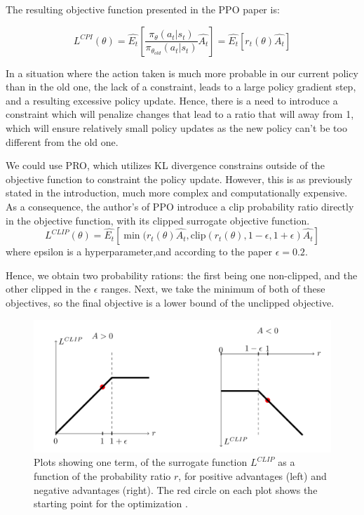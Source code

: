 \documentclass[12pt,a4paper]{article}
\begin{document}
The resulting objective function presented in the PPO paper is:

\begin{equation}
L^{CPI}(\theta) =\hat{E_{t}} [\frac{\pi_{\theta}(a_t|s_t)}{ \pi_{\theta_{old}} (a_t|s_t) }  \hat{{A_t}}  ]  = \hat{E_{t}}[r_t (\theta)  \hat{{A_t}} ]
\end{equation}

In a situation where the action taken is much more probable in our current policy than in the old one, the lack of a constraint, leads to a large policy gradient step, and a resulting excessive policy update. Hence, there is a need to introduce a constraint which will penalize changes that lead to a ratio that will away from 1, which will ensure relatively small policy updates as the new policy can't be too different from the old one.

We could use PRO, which utilizes KL divergence constrains outside of the objective function to constraint the policy update. However, this is as previously stated in the introduction, much more complex and computationally expensive.
As a consequence, the author's of PPO introduce a clip probability ratio directly in the objective function, with its clipped surrogate objective function.
\begin{equation}
L^{CLIP}(\theta) =\hat{E_{t}} [\min(r_t (\theta) \hat{{A_t}}  , \mbox{clip}(r_t (\theta), 1 - \epsilon, 1 + \epsilon) \hat{{A_t}} ]
\end{equation}
where epsilon is a hyperparameter,and according to the paper $\epsilon = 0.2$.

Hence, we obtain two probability rations: the first being one non-clipped, and the other clipped in the $\epsilon$ ranges. Next, we take the minimum of both of these objectives, so the final objective is a lower bound of the unclipped objective. 


\begin{figure}[H]
\begin{center}
\includegraphics[width=\columnwidth, angle = 0]{img/clipped.png}
\end{center}
\caption{Plots showing one term, of the surrogate function $L^{CLIP}$ as a function of the probability ratio $r$, for positive advantages (left) and negative advantages  (right). The red circle on each plot shows the starting point for the optimization \cite{PPO}.}
\label{img:clip}
\end{figure}
\end{document}
